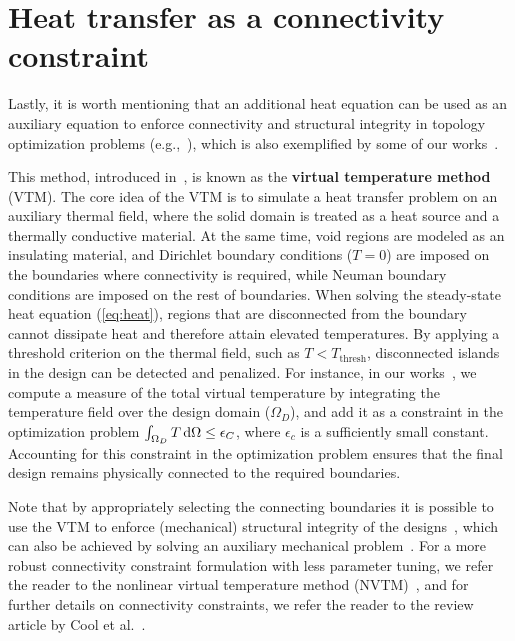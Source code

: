 \section{Heat transfer as a connectivity constraint}\label{sec:aux}

Lastly, it is worth mentioning that an additional heat equation can be used as an auxiliary equation to enforce connectivity
and structural integrity in topology optimization problems (e.g.,~\cite{vanessa, structural_heat}), which is also exemplified by some of our
works~\cite{ownpub1,ownpub2}. 

This method, introduced in~\cite{li_structural_2016}, is known as the \textbf{virtual temperature method} (VTM). The core idea of the VTM is to simulate a heat transfer problem on an auxiliary thermal field, where the solid domain
 is treated as a heat source and a thermally conductive material. At the same time, void regions are modeled as an
insulating material, and Dirichlet boundary conditions ($T = 0$) are imposed on the boundaries where connectivity is required, while Neuman boundary conditions are imposed
on the rest of boundaries. When 
solving the steady-state heat equation (\eqref{eq:heat}), regions that are disconnected from the boundary 
cannot dissipate heat and therefore attain elevated temperatures. By applying a threshold criterion on the thermal field, such as $T < T_\text{thresh}$, disconnected islands in the design can be 
detected and penalized. For instance, in our works~\cite{ownpub1,ownpub2}, we compute a measure of the total virtual temperature
by integrating the temperature field over the design domain ($\Omega_D$), and add it as a constraint in the optimization problem 
$\int_{\Omega_D} T \mathop{}\!\text{d} \Omega \leq \epsilon_C$, where $\epsilon_c$ is a sufficiently small constant. Accounting for this constraint in the optimization problem ensures that the final design remains physically connected to the required 
boundaries. 


Note that by appropriately selecting the connecting boundaries it is possible to use the VTM to enforce
(mechanical) structural integrity of the designs~\cite{structural_heat}, which can also be achieved by solving an auxiliary
mechanical problem~\cite{structural_integrity}. For a more robust connectivity constraint formulation with less parameter tuning, we refer the reader to the nonlinear 
virtual temperature method (NVTM)~\cite{nvtm}, and for further details on connectivity constraints, we refer the reader to the review 
article by Cool et al.~\cite{vanessa}.
